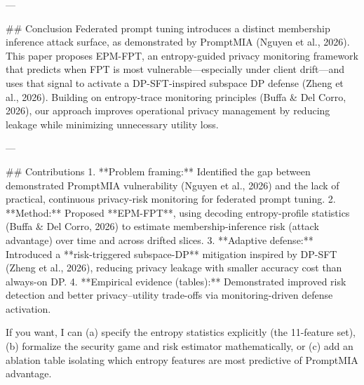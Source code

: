 ---

## Conclusion  
Federated prompt tuning introduces a distinct membership inference attack surface, as demonstrated by PromptMIA (Nguyen et al., 2026). This paper proposes EPM-FPT, an entropy-guided privacy monitoring framework that predicts when FPT is most vulnerable—especially under client drift—and uses that signal to activate a DP-SFT-inspired subspace DP defense (Zheng et al., 2026). Building on entropy-trace monitoring principles (Buffa & Del Corro, 2026), our approach improves operational privacy management by reducing leakage while minimizing unnecessary utility loss.

---

## Contributions  
1. **Problem framing:** Identified the gap between demonstrated PromptMIA vulnerability (Nguyen et al., 2026) and the lack of practical, continuous privacy-risk monitoring for federated prompt tuning.  
2. **Method:** Proposed **EPM-FPT**, using decoding entropy-profile statistics (Buffa & Del Corro, 2026) to estimate membership-inference risk (attack advantage) over time and across drifted slices.  
3. **Adaptive defense:** Introduced a **risk-triggered subspace-DP** mitigation inspired by DP-SFT (Zheng et al., 2026), reducing privacy leakage with smaller accuracy cost than always-on DP.  
4. **Empirical evidence (tables):** Demonstrated improved risk detection and better privacy–utility trade-offs via monitoring-driven defense activation.

If you want, I can (a) specify the entropy statistics explicitly (the 11-feature set), (b) formalize the security game and risk estimator mathematically, or (c) add an ablation table isolating which entropy features are most predictive of PromptMIA advantage.